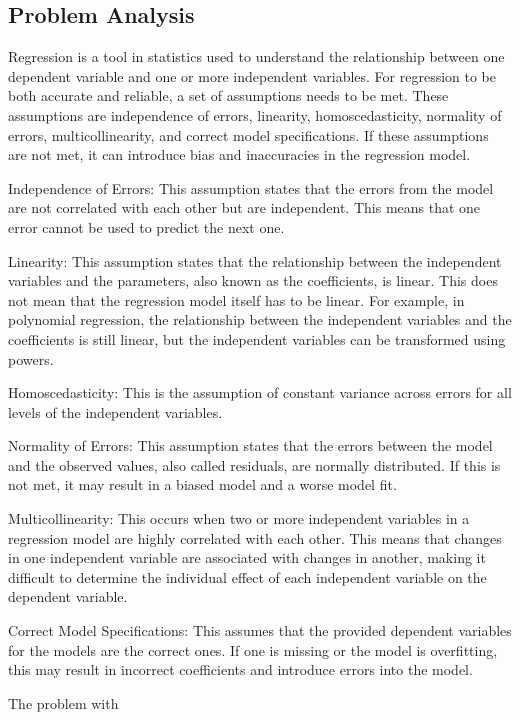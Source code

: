 \subsection{Problem Analysis}

Regression is a tool in statistics used to understand the relationship between one dependent variable and one or more independent variables. For regression to be both accurate and reliable, a set of assumptions needs to be met. These assumptions are independence of errors, linearity, homoscedasticity, normality of errors, multicollinearity, and correct model specifications. If these assumptions are not met, it can introduce bias and inaccuracies in the regression model.

Independence of Errors: This assumption states that the errors from the model are not correlated with each other but are independent. This means that one error cannot be used to predict the next one.

Linearity: This assumption states that the relationship between the independent variables and the parameters, also known as the coefficients, is linear. This does not mean that the regression model itself has to be linear. For example, in polynomial regression, the relationship between the independent variables and the coefficients is still linear, but the independent variables can be transformed using powers.

Homoscedasticity: This is the assumption of constant variance across errors for all levels of the independent variables.

Normality of Errors: This assumption states that the errors between the model and the observed values, also called residuals, are normally distributed. If this is not met, it may result in a biased model and a worse model fit.

Multicollinearity: This occurs when two or more independent variables in a regression model are highly correlated with each other. This means that changes in one independent variable are associated with changes in another, making it difficult to determine the individual effect of each independent variable on the dependent variable.

Correct Model Specifications: This assumes that the provided dependent variables for the models are the correct ones. If one is missing or the model is overfitting, this may result in incorrect coefficients and introduce errors into the model.

The problem with
